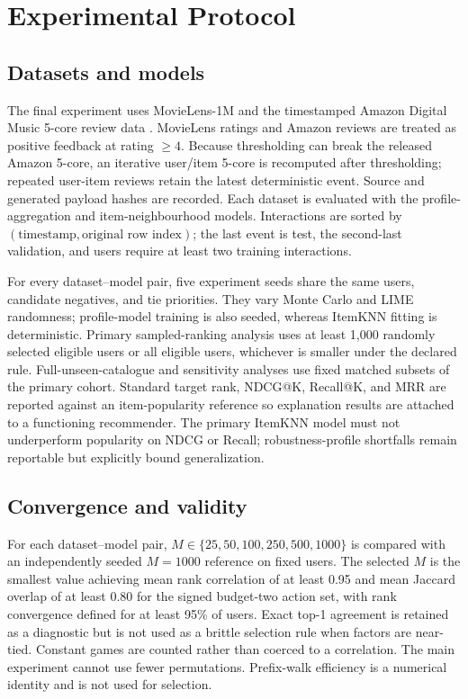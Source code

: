 \documentclass[11pt]{article}
\begin{document}
\section{Experimental Protocol}
\subsection{Datasets and models}
The final experiment uses MovieLens-1M \citep{harper2016} and the timestamped Amazon Digital Music 5-core review data \citep{ni2019}. MovieLens ratings and Amazon reviews are treated as positive feedback at rating $\ge4$. Because thresholding can break the released Amazon 5-core, an iterative user/item 5-core is recomputed after thresholding; repeated user-item reviews retain the latest deterministic event. Source and generated payload hashes are recorded. Each dataset is evaluated with the profile-aggregation and item-neighbourhood models. Interactions are sorted by $(\text{timestamp},\text{original row index})$; the last event is test, the second-last validation, and users require at least two training interactions.

For every dataset--model pair, five experiment seeds share the same users, candidate negatives, and tie priorities. They vary Monte Carlo and LIME randomness; profile-model training is also seeded, whereas ItemKNN fitting is deterministic. Primary sampled-ranking analysis uses at least 1,000 randomly selected eligible users or all eligible users, whichever is smaller under the declared rule. Full-unseen-catalogue and sensitivity analyses use fixed matched subsets of the primary cohort. Standard target rank, NDCG@K, Recall@K, and MRR are reported against an item-popularity reference so explanation results are attached to a functioning recommender. The primary ItemKNN model must not underperform popularity on NDCG or Recall; robustness-profile shortfalls remain reportable but explicitly bound generalization.

\subsection{Convergence and validity}
For each dataset--model pair, $M\in\{25,50,100,250,500,1000\}$ is compared with an independently seeded $M=1000$ reference on fixed users. The selected $M$ is the smallest value achieving mean rank correlation of at least 0.95 and mean Jaccard overlap of at least 0.80 for the signed budget-two action set, with rank convergence defined for at least 95\% of users. Exact top-1 agreement is retained as a diagnostic but is not used as a brittle selection rule when factors are near-tied. Constant games are counted rather than coerced to a correlation. The main experiment cannot use fewer permutations. Prefix-walk efficiency is a numerical identity and is not used for selection.
\end{document}
